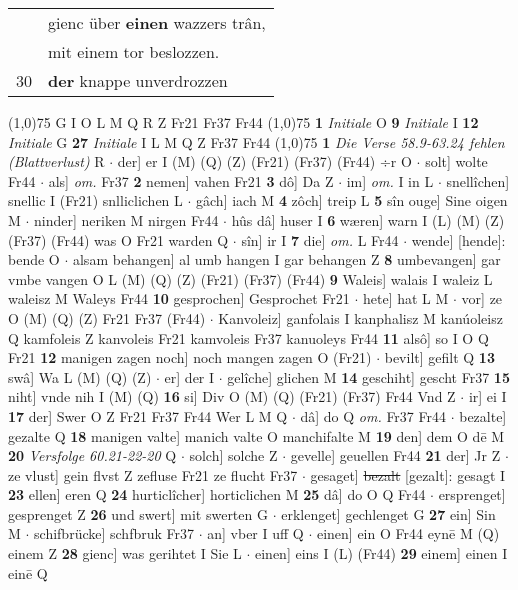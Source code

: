 \documentclass[8pt,a4paper,notitlepage]{article}
\begin{document}
\begin{table}[ht]
\begin{minipage}[t]{0.5\linewidth}
\begin{tabular}{rl}
 & gienc über \textbf{einen} wazzers trân,\\ 
 & mit einem tor beslozzen.\\ 
30 & \textbf{der} knappe unverdrozzen\\ 
\end{tabular}
\scriptsize
\line(1,0){75} \newline
G I O L M Q R Z Fr21 Fr37 Fr44 \newline
\line(1,0){75} \newline
\textbf{1} \textit{Initiale} O  \textbf{9} \textit{Initiale} I  \textbf{12} \textit{Initiale} G  \textbf{27} \textit{Initiale} I L M Q Z Fr37 Fr44  \newline
\line(1,0){75} \newline
\textbf{1} \textit{Die Verse 58.9-63.24 fehlen (Blattverlust)} R   $\cdot$ der] er I (M) (Q) (Z) (Fr21) (Fr37) (Fr44) ÷r O  $\cdot$ solt] wolte Fr44  $\cdot$ als] \textit{om.} Fr37 \textbf{2} nemen] vahen Fr21 \textbf{3} dô] Da Z  $\cdot$ im] \textit{om.} I in L  $\cdot$ snellîchen] snellic I (Fr21) snlliclichen L  $\cdot$ gâch] iach M \textbf{4} zôch] treip L \textbf{5} sîn ouge] Sine oigen M  $\cdot$ ninder] neriken M nirgen Fr44  $\cdot$ hûs dâ] huser I \textbf{6} wæren] warn I (L) (M) (Z) (Fr37) (Fr44) was O Fr21 warden Q  $\cdot$ sîn] ir I \textbf{7} die] \textit{om.} L Fr44  $\cdot$ wende] [hende]: bende O  $\cdot$ alsam behangen] al umb hangen I gar behangen Z \textbf{8} umbevangen] gar vmbe vangen O L (M) (Q) (Z) (Fr21) (Fr37) (Fr44) \textbf{9} Waleis] walais I waleiz L waleisz M Waleys Fr44 \textbf{10} gesprochen] Gesprochet Fr21  $\cdot$ hete] hat L M  $\cdot$ vor] ze O (M) (Q) (Z) Fr21 Fr37 (Fr44)  $\cdot$ Kanvoleiz] ganfolais I kanphalisz M kanúoleisz Q kamfoleis Z kanvoleis Fr21 kamvoleis Fr37 kanuoleys Fr44 \textbf{11} alsô] so I O Q Fr21 \textbf{12} manigen zagen noch] noch mangen zagen O (Fr21)  $\cdot$ bevilt] gefilt Q \textbf{13} swâ] Wa L (M) (Q) (Z)  $\cdot$ er] der I  $\cdot$ gelîche] glichen M \textbf{14} geschiht] gescht Fr37 \textbf{15} niht] vnde nih I (M) (Q) \textbf{16} si] Div O (M) (Q) (Fr21) (Fr37) Fr44 Vnd Z  $\cdot$ ir] ei I \textbf{17} der] Swer O Z Fr21 Fr37 Fr44 Wer L M Q  $\cdot$ dâ] do Q \textit{om.} Fr37 Fr44  $\cdot$ bezalte] gezalte Q \textbf{18} manigen valte] manich valte O manchifalte M \textbf{19} den] dem O dē M \textbf{20} \textit{Versfolge 60.21-22-20} Q   $\cdot$ solch] solche Z  $\cdot$ gevelle] geuellen Fr44 \textbf{21} der] Jr Z  $\cdot$ ze vlust] gein flvst Z zefluse Fr21 ze flucht Fr37  $\cdot$ gesaget] \sout{bezalt} [gezalt]: gesagt I \textbf{23} ellen] eren Q \textbf{24} hurticlîcher] horticlichen M \textbf{25} dâ] do O Q Fr44  $\cdot$ ersprenget] gesprenget Z \textbf{26} und swert] mit swerten G  $\cdot$ erklenget] gechlenget G \textbf{27} ein] Sin M  $\cdot$ schifbrücke] schfbruk Fr37  $\cdot$ an] vber I uff Q  $\cdot$ einen] ein O Fr44 eynē M (Q) einem Z \textbf{28} gienc] was gerihtet I Sie L  $\cdot$ einen] eins I (L) (Fr44) \textbf{29} einem] einen I einē Q \newline

\end{minipage}
\end{table}
\end{document}
